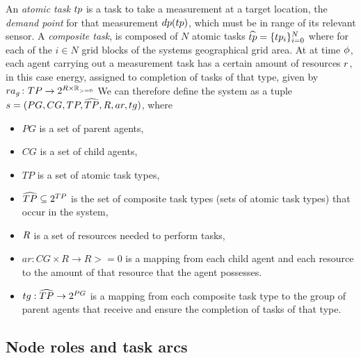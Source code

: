 An \textit{atomic task} $\varAtomicTask{}{}$ is a task to take a measurement at a target location, the \textit{demand point} for that measurement $\functionTaskDemandPoint{}{}$, which must be in range of its relevant sensor. A \textit{composite task}, is composed of $N$ atomic tasks $\varCompositeTask{}{} = \lbrace \varAtomicTask{i}{} \rbrace_{i=0}^N$ where for each of the $i\in N$ grid blocks of the systems geographical grid area. At at time $\phi$, each agent carrying out a measurement task has a certain amount of resources $\varResource{}{}$, in this case energy, assigned to completion of tasks of that type, given by $\formalTaskResourceAllocation{}{}$
We can therefore define the system as a tuple $s = (PG, CG, \setAtomicTask{}{}, \setCompositeTask{}{}, \setResource{}{}, ar, tg)$, where
\begin{itemize}
 \item $PG$ is a set of parent agents,
 \item $CG$ is a set of child agents,
 \item $TP$ is a set of atomic task types,
 \item $\setCompositeTask{}{} \subseteq \powerSetSymbol{\setAtomicTask{}{}}{}{}$ is the set of composite task types (sets of atomic task types) that occur in the system,
 \item $\setResource{}{}$ is a set of resources needed to perform tasks,
 \item $ar: CG \times R \rightarrow R>=0$ is a mapping from each child agent and each resource to the amount of that resource that
the agent possesses.
\item $tg: \setCompositeTask{}{} \rightarrow 2^{PG}$ is a mapping from each composite task type to the group of parent agents that receive and ensure the completion of tasks of that type.
\end{itemize}

\subsection{Node roles and task arcs}
\newcommand{\formalSinkRole}[2]{
	\functionFormal{sink}
	{\setCompositeTask{}{} \times \setAgents{}{}}
	{\setAgents{}{}}
}
\newcommand{\formalSenseRole}[2]{
	\functionFormal{sense}
	{\setAtomicTask{}{} \times \setAgents{}{}}
	{\powerSetAgents{}{}}
}
\newcommand{\formalActiveRole}[2]{
	\functionFormal{active}
	{\setAtomicTask{}{} \times \setAgents{}{}}
	{\powerSetAgents{}{}}
}
\newcommand{\formalIdleRole}[2]{
	\functionFormal{idle_{\setTime{}{}}}
	{\setAgents{}{}}
	{\setAgents{}{}}
}
\newcommand{\formalSleepRole}[2]{
	\functionFormal{sink_{\setTime{}{}}}
	{\setAgents{}{}}
	{\setAgents{}{}}
}
\newcommand{\functionSinkRole}[2]{\functionSignature{sink}{\varCompositeTask{}{}, \setAgents{}{}}}
	
